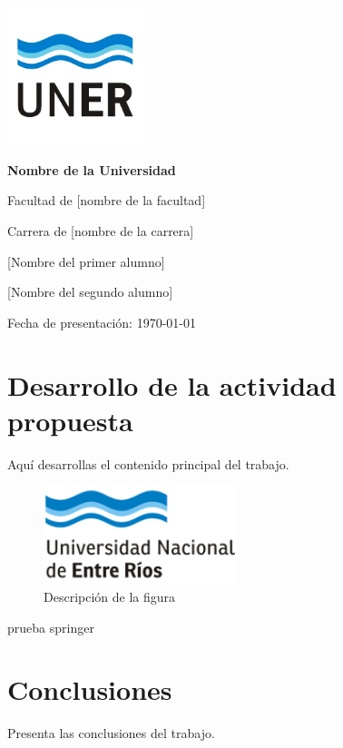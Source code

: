\documentclass[a4paper,10pt]{article}
\begin{document}
\begin{titlepage}
	\centering
	\vspace*{1.5cm}
	\includegraphics[width=0.3\textwidth]{unerlogo.png} %
	\linebreak
	\vspace{0.5cm} %
	{\LARGE\bfseries Nombre de la Universidad\par}
	{\Large Facultad de [nombre de la facultad]\par}
	\vspace{0.5cm}
	{\Large Carrera de [nombre de la carrera]\par}
	\vspace{0.5cm}
	{\Large [Nombre del primer alumno]\par}
	{\Large [Nombre del segundo alumno]\par}
	\vfill
	{\large Fecha de presentación: \today\par}
\end{titlepage}
	
	\tableofcontents
	\clearpage
	\listoffigures
	\clearpage
	
	\section{Desarrollo de la actividad propuesta}
	Aquí desarrollas el contenido principal del trabajo. \parencite{marquez2011metaversos}
	
	\begin{figure}[h]
		\centering
		\includegraphics[width=0.5\textwidth]{uner.png}
		\caption{Descripción de la figura}
		\label{fig:ejemplo}
	\end{figure}
	
	prueba springer  \cite{cheng2023metaverse}
	
	\pagebreak
	\section{Conclusiones}
	Presenta las conclusiones del trabajo.
	\pagebreak
	\printbibliography[heading=bibintoc]
\end{document}
